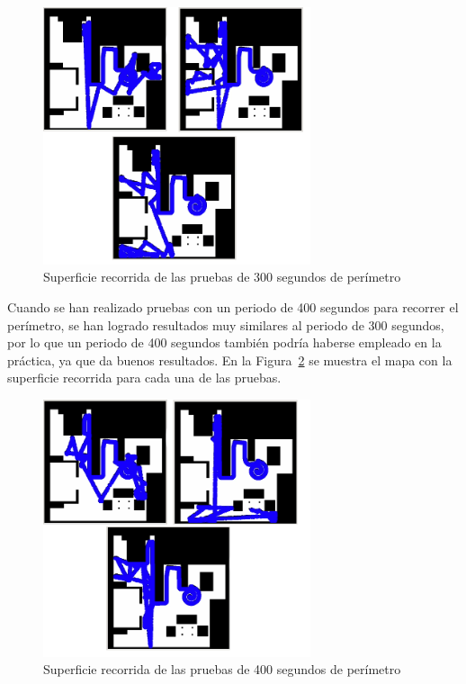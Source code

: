 \begin{figure}[H]
  \begin{center}
    \includegraphics[width=0.7\textwidth]{figures/Vacuum/Referee300.png}
		\caption{Superficie recorrida de las pruebas de 300 segundos de perímetro}
		\label{fig.Referee300}
		\end{center}
\end{figure}

Cuando se han realizado pruebas con un periodo de 400 segundos para recorrer el perímetro, se han logrado resultados muy similares al periodo de 300 segundos, por lo que un periodo de 400 segundos también podría haberse empleado en la práctica, ya que da buenos resultados. En la Figura~\ref{fig.Referee400} se muestra el mapa con la superficie recorrida para cada una de las pruebas.

\begin{figure}[H]
  \begin{center}
    \includegraphics[width=0.7\textwidth]{figures/Vacuum/Referee400.png}
		\caption{Superficie recorrida de las pruebas de 400 segundos de perímetro}
		\label{fig.Referee400}
		\end{center}
\end{figure}


